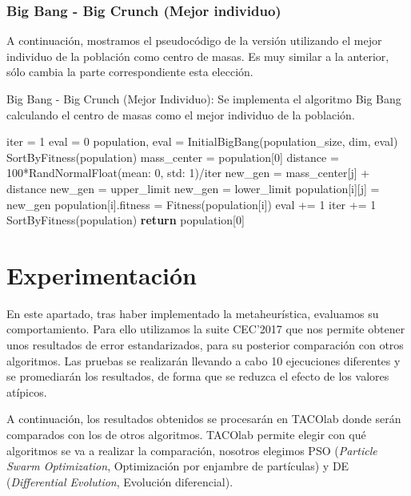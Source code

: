 \newpage
\section{Big Bang - Big Crunch (Mejor individuo)}
A continuación, mostramos el pseudocódigo de la versión utilizando el mejor individuo de la población como centro de masas. Es muy similar a la anterior, sólo cambia la parte correspondiente esta elección.
\begin{algorithm}[H]
\caption{Big Bang - Big Crunch (Mejor Individuo): Se implementa el algoritmo Big Bang calculando el centro de masas como el mejor individuo de la población.}
\begin{algorithmic}[1]
  \State iter = 1
  \State eval = 0
  \State population, eval = InitialBigBang(population\_size, dim, eval)
  \State
    \State SortByFitness(population)
    \State mass\_center = population[0]
    \State
        \State distance = 100*RandNormalFloat(mean: 0, std: 1)/iter
        \State new\_gen = mass\_center[j] + distance
        \State
          \State new\_gen = upper\_limit
        \EndIf
          \State new\_gen = lower\_limit
        \EndIf
        \State
        \State population[i][j] = new\_gen
      \EndFor
      \State population[i].fitness = Fitness(population[i])
      \State eval += 1
    \EndFor
    \State iter += 1 
  \EndWhile
  \State
  \State SortByFitness(population)
  \State \textbf{return} population[0]
\EndProcedure
\end{algorithmic}
\end{algorithm}


\part{Experimentación}
En este apartado, tras haber implementado la metaheurística, evaluamos su comportamiento. Para ello utilizamos la suite CEC'2017 que nos permite obtener unos resultados de error estandarizados, para su posterior comparación con otros algoritmos. Las pruebas se realizarán llevando a cabo 10 ejecuciones diferentes y se promediarán los resultados, de forma que se reduzca el efecto de los valores atípicos. 

A continuación, los resultados obtenidos se procesarán en TACOlab \cite{tacolab} donde serán comparados con los de otros algoritmos. TACOlab permite elegir con qué algoritmos se va a realizar la comparación, nosotros elegimos PSO (\textit{Particle Swarm Optimization}, Optimización por enjambre de partículas) y DE (\textit{Differential Evolution}, Evolución diferencial).

